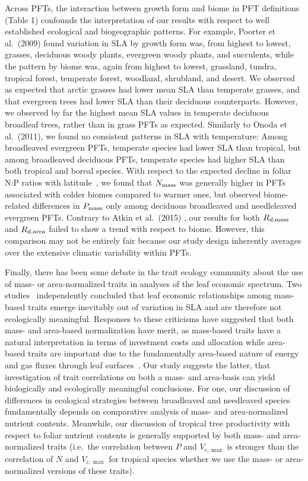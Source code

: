 Across PFTs, the interaction between growth form and biome in PFT definitions (Table 1) confounds the interpretation of our results with respect to well established ecological and biogeographic patterns.
For example, Poorter et al.~(2009) \nocite{poorter_2009_causes} found variation in SLA by growth form was, from highest to lowest, grasses, deciduous woody plants, evergreen woody plants, and succulents, while the pattern by biome was, again from highest to lowest, grassland, tundra, tropical forest, temperate forest, woodland, shrubland, and desert.
We observed as expected that arctic grasses had lower mean SLA than temperate grasses, and that evergreen trees had lower SLA than their deciduous counterparts.
However, we observed by far the highest mean SLA values in temperate deciduous broadleaf trees, rather than in grass PFTs as expected.
Similarly to Onoda et al.~(2011), we found no consistent patterns in SLA with temperature: \nocite{onoda_2011_global}
Among broadleaved evergreen PFTs, temperate species had lower SLA than tropical, but among broadleaved deciduous PFTs, temperate species had higher SLA than both tropical and boreal species.
With respect to the expected decline in foliar N:P ratios with latitude~\cite{reich_global_2004}, we found that $N_{\text{mass}}$ was generally higher in PFTs associated with colder biomes compared to warmer ones, but observed biome-related differences in $P_{\text{mass}}$ only among deciduous broadleaved and needleleaved evergreen PFTs.
Contrary to Atkin et al.~(2015) \nocite{atkin_global_2015}, our results for both $R_{d,\text{mass}}$ and $R_{d,\text{area}}$ failed to show a trend with respect to biome.
However, this comparison may not be entirely fair because our study design inherently averages over the extensive climatic variability within PFTs.

Finally, there has been some debate in the trait ecology community about the use of mass- or area-normalized traits in analyses of the leaf economic spectrum.
Two studies~\cite{osnas_global_2013,lloyd_les} independently concluded that leaf economic relationships among mass-based traits emerge inevitably out of variation in SLA and are therefore not ecologically meaningful.
Responses to these criticisms have suggested that both mass- and area-based normalization have merit, as mass-based traits have a natural interpretation in terms of investment costs and allocation while area-based traits are important due to the fundamentally area-based nature of energy and gas fluxes through leaf surfaces~\cite{westoby_lloyd_response,poorter_les_response}.
Our study suggests the latter, that investigation of trait correlations on both a mass- and area-basis can yield biologically and ecologically meaningful conclusions.
For one, our discussion of differences in ecological strategies between broadleaved and needleaved species fundamentally depends on comparative analysis of mass- and area-normalized nutrient contents.
Meanwhile, our discussion of tropical tree productivity with respect to foliar nutrient contents is generally supported by both mass- and area-normalized traits (i.e.\ the correlation between $P$ and $V_{c,\max}$ is stronger than the correlation of $N$ and $V_{c,\max}$ for tropical species whether we use the mass- or area-normalized versions of these traits).


